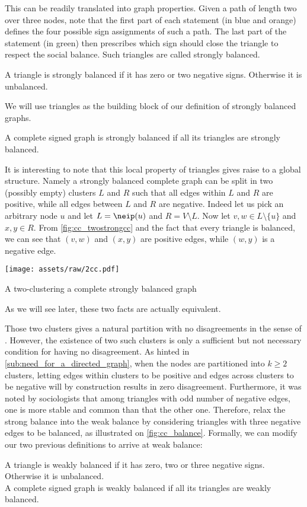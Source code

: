 This can be readily translated into graph properties. Given a path of length two over three nodes,
note that the first part of each statement (in blue and orange) defines the four possible sign
assignments of such a path. The last part of the statement (in green) then prescribes which sign
should close the triangle to respect the social balance. Such triangles are called strongly balanced.
\begin{definition}
	A triangle is strongly balanced if it has zero or two negative signs. Otherwise it is unbalanced.
\end{definition}

We will use triangles as the building block of our definition of strongly balanced graphs.
\begin{definition}
	A complete signed graph is strongly balanced if all its triangles are strongly balanced.
\end{definition}

It is interesting to note that this local property of triangles gives raise to a global structure.
Namely a strongly balanced complete graph can be split in two (possibly empty) clusters $L$ and $R$
such that all edges within $L$ and $R$ are positive, while all edges between $L$ and $R$ are
negative. Indeed let us pick an arbitrary node $u$ and let $L=\neip(u)$ and $R=V\setminus L$. Now
let $v,w\in L\setminus \{u\}$ and $x,y\in R$. From \autoref{fig:cc_twostrongcc} and the fact that
every triangle is balanced, we can see that $(v,w)$ and $(x,y)$ are positive edges, while $(w,y)$ is
a negative edge.
\begin{marginfigure}
  \centering
  \texttt{[image: assets/raw/2cc.pdf]}
  \caption{A two-clustering a complete strongly balanced graph}
  \label{fig:cc_twostrongcc}
\end{marginfigure}
As we will see later, these two facts are actually equivalent.

Those two clusters gives a natural partition with no disagreements in the sense of \pcc{}. However,
the existence of two such clusters is only a sufficient but not necessary condition for having no
disagreement. As hinted in \autoref{sub:need_for_a_directed_graph}, when the nodes are partitioned
into $k\geq 2$ clusters, letting edges within clusters to be positive and edges across clusters to
be negative will by construction results in zero disagreement. Furthermore, it was noted by
sociologists that among triangles with odd number of negative edges, one is more stable and common
than that the other one. Therefore, \textcite{davis1967clustering} relax the strong balance into the
weak balance by considering triangles with three negative edges to be balanced, as illustrated on
\autoref{fig:cc_balance}. Formally, we can modify our two previous definitions to arrive at weak
balance:
\begin{definition}
	A triangle is weakly balanced if it has zero, two or three negative signs. Otherwise it is
	unbalanced. \\
	A complete signed graph is weakly balanced if all its triangles are weakly balanced.
\end{definition}

